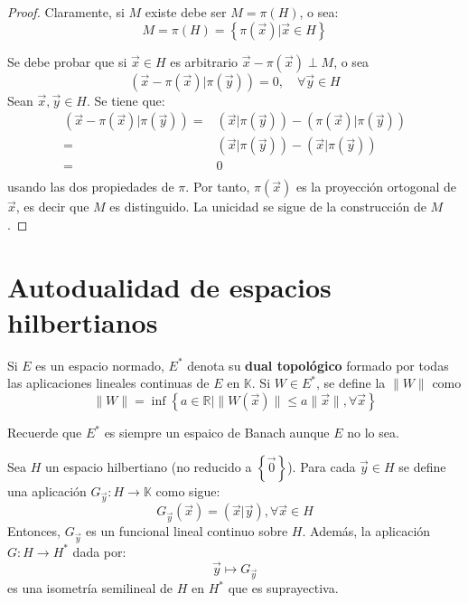 \documentclass[12pt]{report}
\theoremstyle{largebreak}
\newcommand\cf[3]{\ensuremath{#1:#2\rightarrow#3}}
\newcommand\norm[1]{\ensuremath{\|#1\|}}
\newcommand\pint[2]{\ensuremath{\left(#1\big| #2\right)}}
\begin{document}
    \begin{proof}
        Claramente, si $M$ existe debe ser $M=\pi(H)$, o sea:
        \begin{equation*}
            M=\pi(H)=\left\{\pi(\vec{x})\big| \vec{x}\in H \right\}
        \end{equation*}
        
        Se debe probar que si $\vec{x}\in H$ es arbitrario $\vec{x}-\pi(\vec{x})\perp M$, o sea
        \begin{equation*}
            \pint{\vec{x}-\pi(\vec{x})}{\pi(\vec{y})}=0,\quad\forall\vec{y}\in H
        \end{equation*}
        Sean $\vec{x},\vec{y}\in H$. Se tiene que:
        \begin{equation*}
            \begin{split}
                \pint{\vec{x}-\pi(\vec{x})}{\pi(\vec{y})}=&\pint{\vec{x}}{\pi(\vec{y})}-\pint{\pi(\vec{x})}{\pi(\vec{y})} \\
                =&\pint{\vec{x}}{\pi(\vec{y})}-\pint{\vec{x}}{\pi(\vec{y})} \\
                =&0\\
            \end{split}
        \end{equation*}
        usando las dos propiedades de $\pi$. Por tanto, $\pi(\vec{x})$ es la proyección ortogonal de $\vec{x}$, es decir que $M$ es distinguido. La unicidad se sigue de la construcción de $M$.
    \end{proof}

    \section{Autodualidad de espacios hilbertianos}

    Si $E$ es un espacio normado, $E^*$ denota su \textbf{dual topológico} formado por todas las aplicaciones lineales continuas de $E$ en $\mathbb{K}$. Si $W\in E^*$, se define la $\norm{W}$ como
    \begin{equation*}
        \norm{W}=\inf\left\{a\in\mathbb{R}\big| \norm{W(\vec{x})}\leq a\norm{\vec{x}},\forall\vec{x} \right\}
    \end{equation*}
    
    Recuerde que $E^*$ es siempre un espaico de Banach aunque $E$ no lo sea.

    \begin{theor}
        Sea $H$ un espacio hilbertiano (no reducido a $\left\{\vec{0} \right\}$). Para cada $\vec{y}\in H$ se define una aplicación $\cf{G_{\vec{y}}}{H}{\mathbb{K}}$ como sigue:
        \begin{equation*}
            G_{\vec{y}}(\vec{x})=\pint{\vec{x}}{\vec{y}},\forall\vec{x}\in H
        \end{equation*}
        Entonces, $G_{\vec{y}}$ es un funcional lineal continuo sobre $H$. Además, la aplicación $\cf{G}{H}{H^*}$ dada por:
        \begin{equation*}
            \vec{y}\mapsto G_{\vec{y}}
        \end{equation*}
         es una isometría semilineal de $H$ en $H^*$ que es suprayectiva.
    \end{theor}
\end{document}
